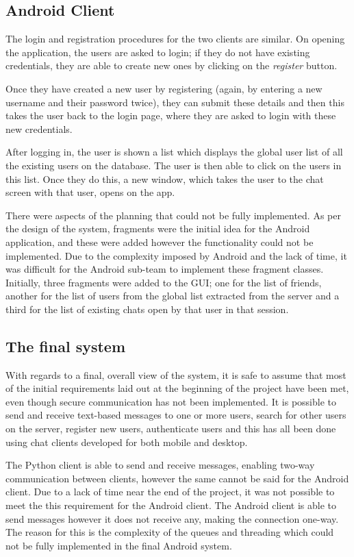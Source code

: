 \documentclass[finalReport.tex]{subfiles}
\begin{document}
\subsection{Android Client}
The login and registration procedures for the two clients are similar. On opening the application, the users are asked to login; if they do not have existing credentials, they are able to create new ones by clicking on the \textit{register} button.
 
Once they have created a new user by registering (again, by entering a new username and their password twice), they can submit these details and then this takes the user back to the login page, where they are asked to login with these new credentials. 

After logging in, the user is shown a list which displays the global user list of all the existing users on the database. The user is then able to click on the users in this list. Once they do this, a new window, which takes the user to the chat screen with that user, opens on the app.

There were aspects of the planning that could not be fully implemented. As per the design of the system, fragments were the initial idea for the Android application, and these were added however the functionality could not be implemented. Due to the complexity imposed by Android and the lack of time, it was difficult for the Android sub-team to implement these fragment classes. Initially, three fragments were added to the GUI; one for the list of friends, another for the list of users from the global list extracted from the server and a third for the list of existing chats open by that user in that session.

\subsection{The final system}
With regards to a final, overall view of the system, it is safe to assume that most of the initial requirements laid out at the beginning of the project have been met, even though secure communication has not been implemented. It is possible to send and receive text-based messages to one or more users, search for other users on the server, register new users, authenticate users and this has all been done using chat clients developed for both mobile and desktop.

The Python client is able to send and receive messages, enabling two-way communication between clients, however the same cannot be said for the Android client. Due to a lack of time near the end of the project, it was not possible to meet the this requirement for the Android client. The Android client is able to send messages however it does not receive any, making the connection one-way. The reason for this is the complexity of the queues and threading which could not be fully implemented in the final Android system.
\end{document}
